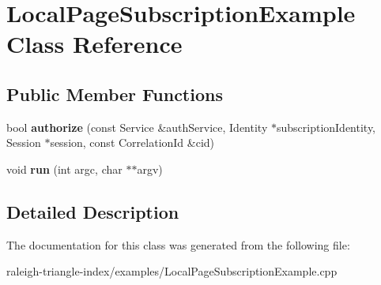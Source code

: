 \section{Local\+Page\+Subscription\+Example Class Reference}
\label{class_local_page_subscription_example}
\subsection*{Public Member Functions}
\begin{DoxyCompactItemize}
\item 
bool {\bfseries authorize} (const Service \&auth\+Service, Identity $\ast$subscription\+Identity, Session $\ast$session, const Correlation\+Id \&cid)\label{class_local_page_subscription_example_a6b1b4eed6008e042bc9cb8c75b187270}

\item 
void {\bfseries run} (int argc, char $\ast$$\ast$argv)\label{class_local_page_subscription_example_a904d7e4202997585911ce5bf700702fe}

\end{DoxyCompactItemize}


\subsection{Detailed Description}


The documentation for this class was generated from the following file\+:\begin{DoxyCompactItemize}
\item 
raleigh-\/triangle-\/index/examples/Local\+Page\+Subscription\+Example.\+cpp\end{DoxyCompactItemize}

